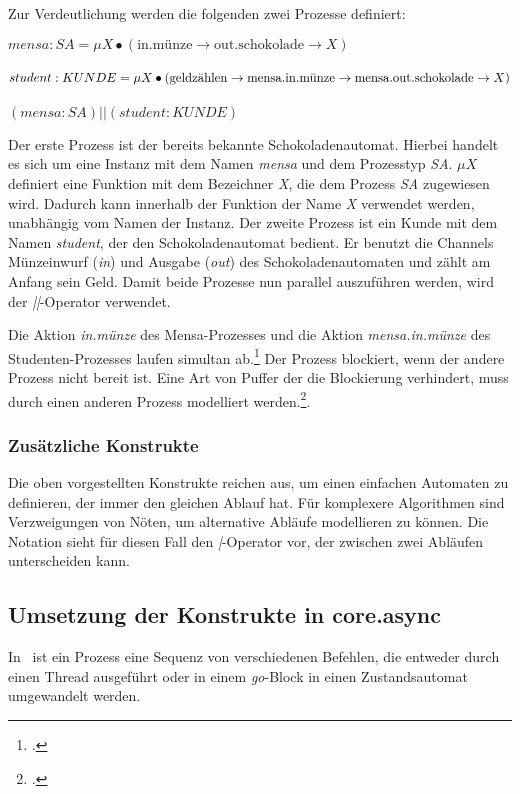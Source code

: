 Zur Verdeutlichung werden die folgenden zwei Prozesse definiert:

\begin{addmargin}[1cm]{0cm}
$mensa:SA = \mu X \bullet (\text{in.münze} \rightarrow \text{out.schokolade} \rightarrow X)$\\\\
$student:KUNDE = \mu X \bullet (\text{geldzählen} \rightarrow \text{mensa.in.münze} \rightarrow \\ \text{mensa.out.schokolade} \rightarrow  X)$\\\\
$ (mensa:SA) || (student:KUNDE) $
\end{addmargin}

Der erste Prozess ist der bereits bekannte Schokoladenautomat. Hierbei handelt es sich um eine Instanz mit dem Namen \textit{mensa} und dem Prozesstyp \textit{SA}. $\mu X$ definiert eine Funktion mit dem Bezeichner \textit{X}, die dem Prozess \textit{SA} zugewiesen wird. Dadurch kann innerhalb der Funktion der Name \textit{X} verwendet werden, unabhängig vom Namen der Instanz.
Der zweite Prozess ist ein Kunde mit dem Namen \textit{student}, der den Schokoladenautomat bedient. Er benutzt die Channels Münzeinwurf (\textit{in}) und Ausgabe (\textit{out}) des Schokoladenautomaten und zählt am Anfang sein Geld. Damit beide Prozesse nun parallel auszuführen werden, wird der \textit{||}-Operator verwendet.

Die Aktion \textit{in.münze} des Mensa-Prozesses und die Aktion \textit{mensa.in.münze} des Studenten-Prozesses laufen simultan ab.\footcite[vgl][Seite 117]{CSPBOOK} Der Prozess blockiert, wenn der andere Prozess nicht bereit ist. Eine Art von Puffer der die Blockierung verhindert, muss durch einen anderen Prozess modelliert werden.\footcite[vgl.][Seite 133]{CSPBOOK}.

\subsubsection{Zusätzliche Konstrukte}
Die oben vorgestellten Konstrukte reichen aus, um einen einfachen Automaten zu definieren, der immer den gleichen Ablauf hat. Für komplexere Algorithmen sind Verzweigungen von Nöten, um alternative Abläufe modellieren zu können. Die Notation sieht für diesen Fall den \textit{|}-Operator vor, der zwischen zwei Abläufen unterscheiden kann.

\subsection{Umsetzung der Konstrukte in core.async}
In \CA\ ist ein Prozess eine Sequenz von verschiedenen Befehlen, die entweder durch einen Thread ausgeführt oder in einem \textit{go}-Block in einen Zustandsautomat umgewandelt werden.

